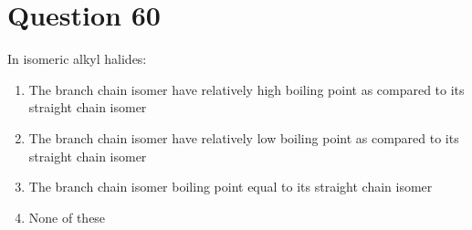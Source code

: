 \documentclass{article}
\begin{document}
\section*{Question 60}
In isomeric alkyl halides:
\begin{enumerate}[label=(\alph*)]
\item The branch chain isomer have relatively high boiling point as compared to its straight chain isomer
\item The branch chain isomer have relatively low boiling point as compared to its straight chain isomer
\item The branch chain isomer boiling point equal to its straight chain isomer
\item None of these
\end{enumerate}
\newpage
\end{document}
